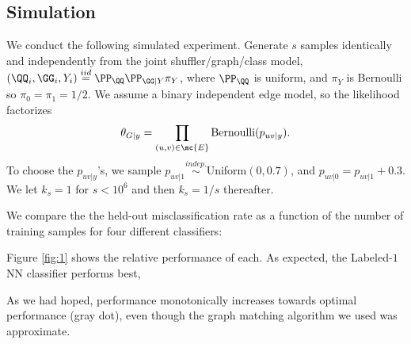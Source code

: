\documentclass[10pt,journal,cspaper,compsoc]{IEEEtran}
\begin{document}




% 


\subsection{Simulation} %
\label{sub:classifiers}


We conduct the following simulated experiment. Generate $s$ samples identically and independently from the joint shuffler/graph/class model, $(\QQ_i,\GG_i,Y_i)\overset{iid}{=}\PP_{\QQ}\PP_{\GG|Y} \pi_Y$, where $\PP_{\QQ}$ is uniform, and $\pi_Y$ is Bernoulli so $\pi_0=\pi_1=1/2$.  We assume a binary independent edge model, so the likelihood factorizes
\begin{align}
	\theta_{G|y} = \prod_{(u,v) \in \mc{E}} \text{Bernoulli}(p_{uv|y}).
\end{align}
To choose the $p_{uv|y}$'s, we sample $p_{uv|1} \overset{indep.}{\sim}$Uniform$(0,0.7)$, and $p_{uv|0}=p_{uv|1}+0.3$.  We let $k_s=1$ for $s<10^6$ and then $k_s=1/s$ thereafter.

We compare the the held-out misclassification rate as a function of the number of training samples for four different classifiers:


Figure \ref{fig:1} shows the relative performance of each.  As expected, the Labeled-$1$NN classifier performs best, 

As we had hoped, performance monotonically increases towards optimal performance (gray dot), even though the graph matching algorithm we used was approximate.
\end{document}
